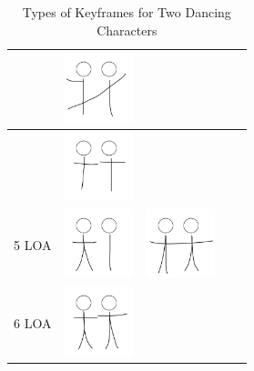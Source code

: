 \begin{table}[!htb]
\begin{tabular}{ | c | c || c | c | c | }
\begin{minipage}{.15\textwidth}
    \end{minipage} 
    & 
    \begin{minipage}{.15\textwidth}
      \includegraphics[width=\linewidth, height=20mm]{img/09keyframe}
    \end{minipage} 
    \\ \hline 
    &
    \begin{minipage}{.15\textwidth}
      \includegraphics[width=\linewidth, height=20mm]{img/4-1loa_separate_keyframe}
    \end{minipage}
    & & & 
    \\ \hline
    5 LOA 
    &
    \begin{minipage}{.15\textwidth}
      \includegraphics[width=\linewidth, height=20mm]{img/5loa_separate_keyframe}
    \end{minipage}
    &
    \begin{minipage}{.15\textwidth}
      \includegraphics[width=\linewidth, height=20mm]{img/10keyframe}
    \end{minipage} & & 
    \\ \hline
    6 LOA 
    &
    \begin{minipage}{.15\textwidth}
      \includegraphics[width=\linewidth, height=20mm]{img/6loa_separate_keyframe}
    \end{minipage}
    & & & 
    \\ \hline
  \end{tabular}
  \caption{Types of Keyframes for Two Dancing Characters}
  \label{table:LOAChart}
\end{table}

